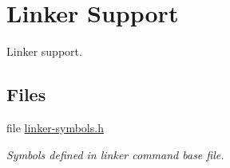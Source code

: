 \hypertarget{group__arm__linker}{}\section{Linker Support}
\label{group__arm__linker}


Linker support.  


\subsection*{Files}
\begin{DoxyCompactItemize}
\item 
file \mbox{\hyperlink{arm_2include_2bsp_2linker-symbols_8h}{linker-\/symbols.\+h}}
\begin{DoxyCompactList}\small\item\em Symbols defined in linker command base file. \end{DoxyCompactList}\end{DoxyCompactItemize}
